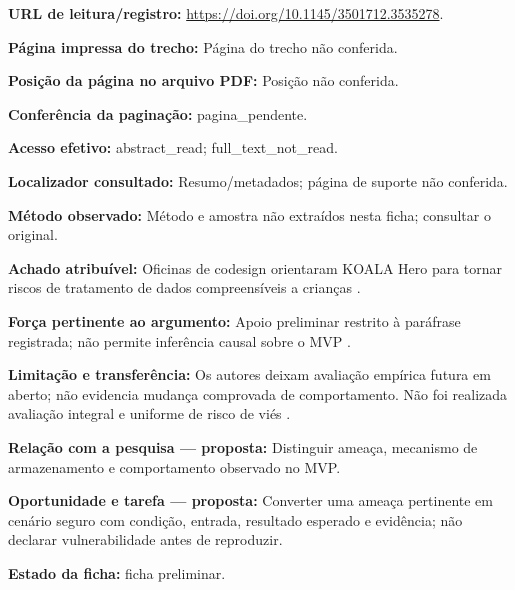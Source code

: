 \noindent\textbf{URL de leitura/registro:} \url{https://doi.org/10.1145/3501712.3535278}.\par\medskip

\noindent\textbf{Página impressa do trecho:} Página do trecho não conferida.\par\medskip

\noindent\textbf{Posição da página no arquivo PDF:} Posição não conferida.\par\medskip

\noindent\textbf{Conferência da paginação:} pagina\_pendente.\par\medskip

\noindent\textbf{Acesso efetivo:} abstract\_read; full\_text\_not\_read.\par\medskip

\noindent\textbf{Localizador consultado:} Resumo/metadados; página de suporte não conferida.\par\medskip

\noindent\textbf{Método observado:} Método e amostra não extraídos nesta ficha; consultar o original.\par\medskip

\noindent\textbf{Achado atribuível:} Oficinas de codesign orientaram KOALA Hero para tornar riscos de tratamento de dados compreensíveis a crianças \citep{OS15}.\par\medskip

\noindent\textbf{Força pertinente ao argumento:} Apoio preliminar restrito à paráfrase registrada; não permite inferência causal sobre o MVP \citep{OS15}.\par\medskip

\noindent\textbf{Limitação e transferência:} Os autores deixam avaliação empírica futura em aberto; não evidencia mudança comprovada de comportamento. Não foi realizada avaliação integral e uniforme de risco de viés \citep{OS15}.\par\medskip

\noindent\textbf{Relação com a pesquisa — proposta:} Distinguir ameaça, mecanismo de armazenamento e comportamento observado no MVP.\par\medskip

\noindent\textbf{Oportunidade e tarefa — proposta:} Converter uma ameaça pertinente em cenário seguro com condição, entrada, resultado esperado e evidência; não declarar vulnerabilidade antes de reproduzir.\par\medskip

\noindent\textbf{Estado da ficha:} ficha preliminar.\par\medskip

